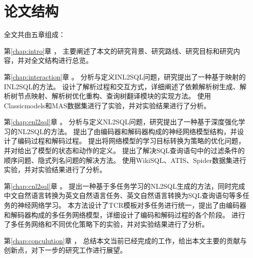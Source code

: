 \section{论文结构}
\label{intro:structure}
全文共由五章组成：

第\ref{chap:intro}章  ， 
主要阐述了本文的研究背景、研究路线、研究目标和研究内容，并对全文结构进行总览。

第\ref{chap:interaction}章  。
分析与定义INL2SQL问题，研究提出了一种基于映射的INL2SQL的方法。
设计了解析过程和交互方式，详细阐述了依赖解析树生成、解析树节点映射、解析树优化重构、查询树翻译模块的实现方法。
使用Classicmodels和MAS数据集进行了实验，并对实验结果进行了分析。

第\ref{chap:enl2sql}章  。
分析与定义NL2SQL问题，研究提出了一种基于深度强化学习的NL2SQL的方法。
提出了由编码器和解码器构成的神经网络模型结构，并设计了编码过程和解码过程。
提出将网络模型的学习目标转换为策略的优化问题，并对给出了模型的状态和动作的定义。
提出了解决SQL查询语句中的过滤条件的顺序问题、隐式列名问题的解决方法。
使用WikiSQL、ATIS、Spider数据集进行实验，并对实验结果进行了分析。


第\ref{chap:cnl2sql}章  。
提出一种基于多任务学习的NL2SQL生成的方法，同时完成中文自然语言转换为英文自然语言任务、英文自然语言转换为SQL查询语句等多任务的神经网络学习。
本方法设计了TCR模板对多任务进行统一，提出了由编码器和解码器构成的多任务网络模型，详细设计了编码和解码过程的各个阶段。
进行了多任务网络和不同优化策略下的实验，并对实验结果进行了分析。


第\ref{chap:conculution}章  ，
总结本文当前已经完成的工作，给出本文主要的贡献与创新点，对下一步的研究工作进行展望。
